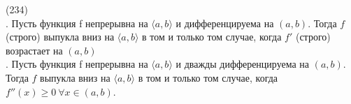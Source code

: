 (234)\\
. Пусть функция f непрерывна на $\langle a, b\rangle$ и дифференцируема на $(a, b)$. Тогда $f$ (строго) выпукла вниз на $\langle a, b\rangle$ в том и только том случае, когда $f'$ (строго) возрастает на $(a, b)$\\
. Пусть функция f непрерывна на $\langle a, b\rangle$ и дважды дифференцируема на $(a, b)$. Тогда $f$ выпукла вниз на $\langle a, b\rangle$ в том и только том случае, когда $f''(x) \ge 0\ \forall x \in (a, b)$.